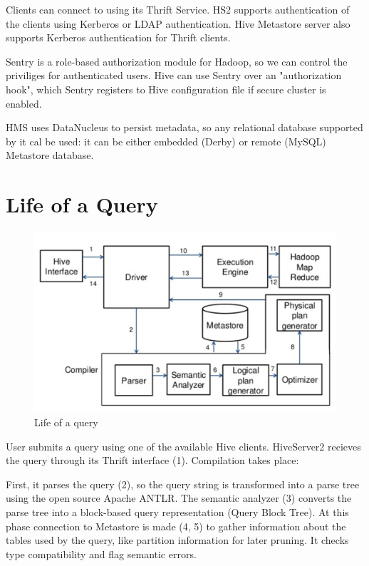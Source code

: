 Clients can connect to  using its Thrift Service. HS2 supports authentication of the clients using Kerberos or LDAP authentication. Hive Metastore server also supports Kerberos authentication for Thrift clients.

Sentry is a role-based authorization module for Hadoop, so we can control the priviliges for authenticated users. Hive can use Sentry over an "authorization hook", which Sentry registers to Hive configuration file if secure cluster is enabled. 

HMS uses DataNucleus to persist metadata, so any relational database supported by it cal be used: it can be either embedded (\eg Derby) or remote (\eg MySQL) Metastore database.

\section{Life of a Query}
\begin{figure}[H]
	\includegraphics[width=150mm, keepaspectratio]{figures/hive-query.png}
	\centering
	\caption{Life of a query  \cite{Hive-query-figure}}
\end{figure}
User submits a query using one of the available Hive clients. HiveServer2 recieves the query through its Thrift interface (1). Compilation takes place: 

First, it parses the query (2), so the query string is transformed into a parse tree using the open source Apache ANTLR.  The semantic analyzer (3) converts the parse tree into a block-based query representation (Query Block Tree). At this phase connection to Metastore is made (4, 5) to gather information about the tables used by the query, like partition information for later pruning. It checks type compatibility and flag semantic errors. 

